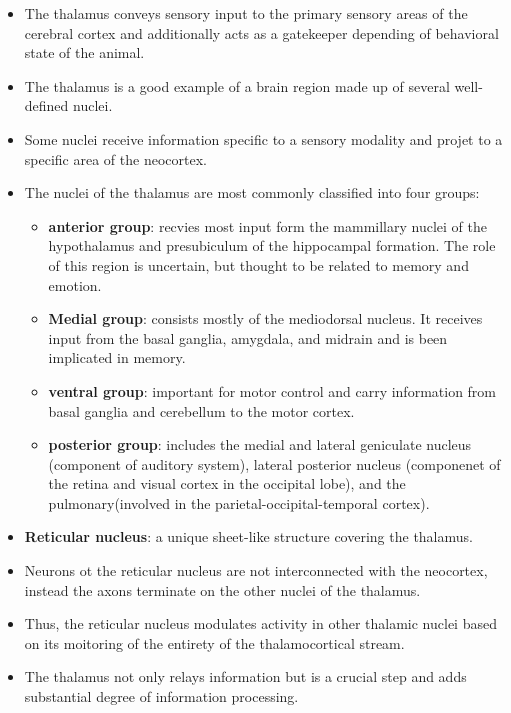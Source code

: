 \documentclass[12pt,a4paper]{article}
\begin{document}
\begin{itemize}
    \item The thalamus conveys sensory input to the primary sensory areas of the cerebral cortex and additionally acts as a gatekeeper depending of behavioral state of the animal.
    \item The thalamus is a good example of a brain region made up of several well-defined nuclei.
    \item Some nuclei receive information specific to a sensory modality and projet to a specific area of the neocortex.
    \item The nuclei of the thalamus are most commonly classified into four groups:
        \begin{itemize}
            \item \textbf{anterior group}: recvies most input form the mammillary nuclei of the hypothalamus and presubiculum of the hippocampal formation. The role of this region is uncertain, but thought to be related to memory and emotion.
            \item \textbf{Medial group}: consists mostly of the mediodorsal nucleus. It receives input from the basal ganglia, amygdala, and midrain and is been implicated in memory.
            \item \textbf{ventral group}: important for motor control and carry information from basal ganglia and cerebellum to the motor cortex.
            \item \textbf{posterior group}: includes the medial and lateral geniculate nucleus (component of auditory system), lateral posterior nucleus (componenet of the retina and visual cortex in the occipital lobe), and the pulmonary(involved in the parietal-occipital-temporal cortex).
        \end{itemize}
    \item \textbf{Reticular nucleus}: a unique sheet-like structure covering the thalamus.
    \item Neurons ot the reticular nucleus are not interconnected with the neocortex, instead the axons terminate on the other nuclei of the thalamus.
    \item Thus, the reticular nucleus modulates activity in other thalamic nuclei based on its moitoring of the entirety of the thalamocortical stream.
    \item The thalamus not only relays information but is a crucial step and adds substantial degree of information processing.
\end{itemize}
\end{document}
